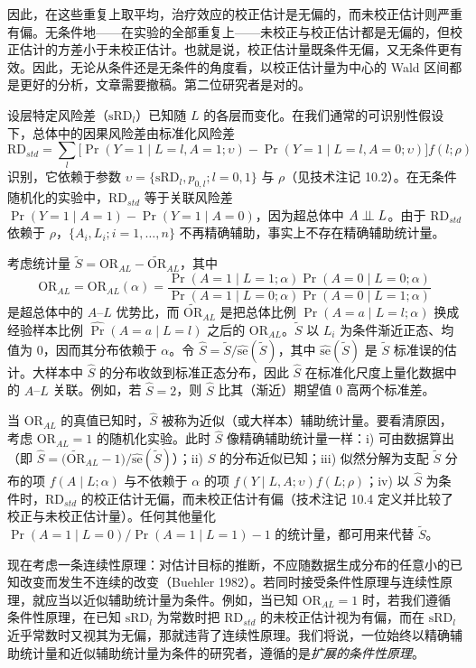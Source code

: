 因此，在这些重复上取平均，治疗效应的校正估计是无偏的，而未校正估计则严重有偏。无条件地——在实验的全部重复上——未校正与校正估计都是无偏的，但校正估计的方差小于未校正估计。也就是说，校正估计量既条件无偏，又无条件更有效。因此，无论从条件还是无条件的角度看，以校正估计量为中心的 Wald 区间都是更好的分析，文章需要撤稿。第二位研究者是对的。

\begin{techpoint}[近似辅助性]
设层特定风险差（$\mathrm{sRD}_l$）已知随 $L$ 的各层而变化。在我们通常的可识别性假设下，总体中的因果风险差由标准化风险差
\[
\mathrm{RD}_{std}=\sum_{l}\bigl[\Pr(Y=1\mid L=l,A=1;\upsilon)-\Pr(Y=1\mid L=l,A=0;\upsilon)\bigr]f(l;\rho)
\]
识别，它依赖于参数 $\upsilon=\{\mathrm{sRD}_l,p_{0,l};l=0,1\}$ 与 $\rho$（见技术注记 10.2）。在无条件随机化的实验中，$\mathrm{RD}_{std}$ 等于关联风险差 $\Pr(Y=1\mid A=1)-\Pr(Y=1\mid A=0)$，因为超总体中 $A\perp\!\!\!\perp L$。由于 $\mathrm{RD}_{std}$ 依赖于 $\rho$，$\{A_i,L_i;i=1,\dots,n\}$ 不再精确辅助，事实上不存在精确辅助统计量。

考虑统计量 $\tilde S=\mathrm{OR}_{AL}-\widetilde{\mathrm{OR}}_{AL}$，其中
\[
\mathrm{OR}_{AL}=\mathrm{OR}_{AL}(\alpha)=\frac{\Pr(A=1\mid L=1;\alpha)\Pr(A=0\mid L=0;\alpha)}{\Pr(A=1\mid L=0;\alpha)\Pr(A=0\mid L=1;\alpha)}
\]
是超总体中的 $A$–$L$ 优势比，而 $\widetilde{\mathrm{OR}}_{AL}$ 是把总体比例 $\Pr(A=a\mid L=l;\alpha)$ 换成经验样本比例 $\widehat{\Pr}(A=a\mid L=l)$ 之后的 $\mathrm{OR}_{AL}$。$\tilde S$ 以 $L_i$ 为条件渐近正态、均值为 0，因而其分布依赖于 $\alpha$。令 $\hat S=\tilde S/\widehat{\mathrm{se}}(\tilde S)$，其中 $\widehat{\mathrm{se}}(\tilde S)$ 是 $\tilde S$ 标准误的估计。大样本中 $\hat S$ 的分布收敛到标准正态分布，因此 $\hat S$ 在标准化尺度上量化数据中的 $A$–$L$ 关联。例如，若 $\hat S=2$，则 $\hat S$ 比其（渐近）期望值 0 高两个标准差。

当 $\mathrm{OR}_{AL}$ 的真值已知时，$\hat S$ 被称为近似（或大样本）辅助统计量。要看清原因，考虑 $\mathrm{OR}_{AL}=1$ 的随机化实验。此时 $\hat S$ 像精确辅助统计量一样：i) 可由数据算出（即 $\hat S=\bigl(\widetilde{\mathrm{OR}}_{AL}-1\bigr)/\widehat{\mathrm{se}}(\tilde S)$）；ii) $\hat S$ 的分布近似已知；iii) 似然分解为支配 $\tilde S$ 分布的项 $f(A\mid L;\alpha)$ 与不依赖于 $\alpha$ 的项 $f(Y\mid L,A;\upsilon)f(L;\rho)$；iv) 以 $\hat S$ 为条件时，$\mathrm{RD}_{std}$ 的校正估计无偏，而未校正估计有偏（技术注记 10.4 定义并比较了校正与未校正估计量）。任何其他量化 $\Pr(A=1\mid L=0)/\Pr(A=1\mid L=1)-1$ 的统计量，都可用来代替 $\tilde S$。

现在考虑一条连续性原理：对估计目标的推断，不应随数据生成分布的任意小的已知改变而发生不连续的改变（Buehler 1982）。若同时接受条件性原理与连续性原理，就应当以近似辅助统计量为条件。例如，当已知 $\mathrm{OR}_{AL}=1$ 时，若我们遵循条件性原理，在已知 $\mathrm{sRD}_l$ 为常数时把 $\mathrm{RD}_{std}$ 的未校正估计视为有偏，而在 $\mathrm{sRD}_l$ 近乎常数时又视其为无偏，那就违背了连续性原理。我们将说，一位始终以精确辅助统计量和近似辅助统计量为条件的研究者，遵循的是\emph{扩展的条件性原理}。
\end{techpoint}

